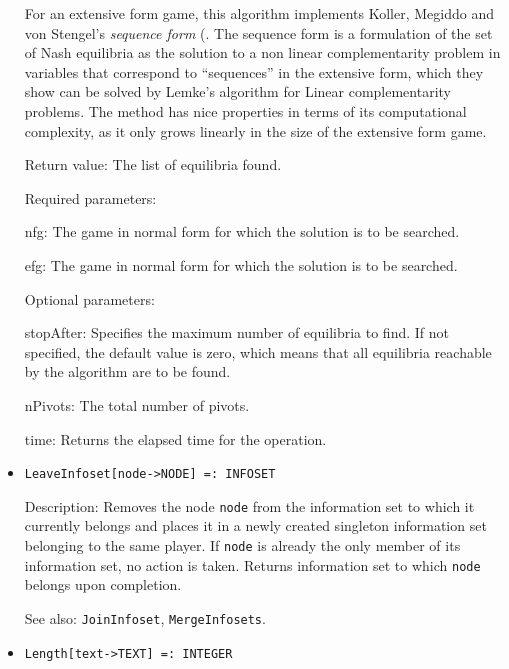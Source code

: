 \begin{itemize}
For an extensive form game, this algorithm implements Koller, Megiddo
and von Stengel's {\em sequence form} (\cite[1994]{KolMegSte:94}. The
sequence form is a formulation of the set of Nash equilibria as the
solution to a non linear complementarity problem in variables that
correspond to ``sequences'' in the extensive form, which they show can
be solved by Lemke's algorithm for Linear complementarity problems.
The method has nice properties in terms of its computational
complexity, as it only grows linearly in the size of the extensive
form game.  

\item
[Return value:] The list of equilibria found.
\item
[Required parameters:]\hfil\null

\bd
\item
[nfg:] The game in normal form for which the solution is to be
searched.
\item
[efg:] The game in normal form for which the solution is to be
searched.
\ed

\item
[Optional parameters:]\hfil\null

\bd
\item
[stopAfter:] Specifies the maximum number of equilibria to find.  If
not specified, the default value is zero, which means that all
equilibria reachable by the algorithm are to be found.
\item
[nPivots:] The total number of pivots. 
\item
[time:] Returns the elapsed time for the operation.
\ed
\ed

\item
\protect \large \begin{verbatim}
LeaveInfoset[node->NODE] =: INFOSET
\end{verbatim}\normalsize

\bd
\item
[Description:] Removes the node \verb+node+ from the information set to
which it currently belongs and places it in a newly created
singleton information set belonging to the same player.  If \verb+node+
is already the only member of its information set, no action is taken.
Returns information set to which \verb+node+ belongs upon completion.
\item
[See also:] {\tt JoinInfoset}, {\tt MergeInfosets}.
\ed

\item
\protect \large \begin{verbatim}
Length[text->TEXT] =: INTEGER
\end{verbatim}\normalsize


\end{itemize}
